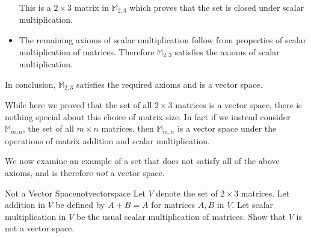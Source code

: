 \begin{solution}
\begin{itemize}
This is a $2 \times 3$ matrix in $\mathbb{M}_{2,3}$ which proves that the set is closed under scalar multiplication. 

\item The remaining axioms of scalar multiplication follow from properties of scalar multiplication of matrices. Therefore $\mathbb{M}_{2,3}$ satisfies the axioms of scalar multiplication. 
\end{itemize}

In conclusion, $\mathbb{M}_{2,3}$ satisfies the required axioms and is a vector space. 
\end{solution}

While here we proved that the set of all $2 \times 3$ matrices is a vector space, there is nothing special about this choice of matrix size. In fact if we instead consider $\mathbb{M}_{m,n}$, the set of all $m \times n$ matrices, then  $\mathbb{M}_{m,n}$ is a vector space under the operations of matrix addition and scalar multiplication. 

We now examine an example of a set that does not satisfy all of the above axioms, and is therefore \textit{not} a vector space. 

\begin{example}{Not a Vector Space}{notvectorspace}
Let $V$ denote the set of $2 \times 3$ matrices. Let addition in $V$ be defined by $A + B = A$ for matrices $A,B$ in $V$. Let scalar multiplication in $V$ be the usual scalar multiplication of matrices. Show that $V$ is not a vector space.
\end{example}

